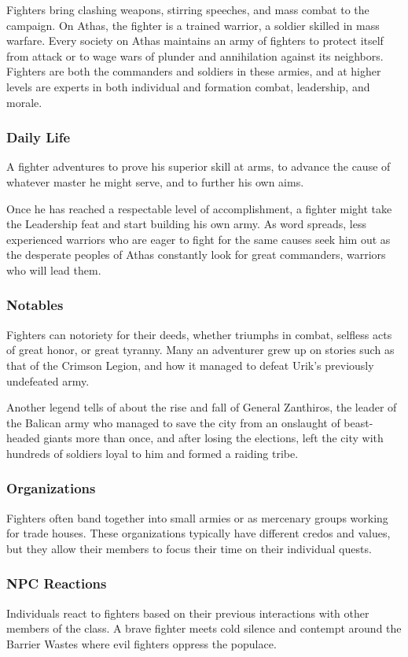 Fighters bring clashing weapons, stirring speeches, and mass combat to the campaign. On Athas, the fighter is a trained warrior, a soldier skilled in mass warfare. Every society on Athas maintains an army of fighters to protect itself from attack or to wage wars of plunder and annihilation against its neighbors. Fighters are both the commanders and soldiers in these armies, and at higher levels are experts in both individual and formation combat, leadership, and morale.

\subsubsection{Daily Life}
A fighter adventures to prove his superior skill at arms, to advance the cause of whatever master he might serve, and to further his own aims.

Once he has reached a respectable level of accomplishment, a fighter might take the Leadership feat and start building his own army. As word spreads, less experienced warriors who are eager to fight for the same causes seek him out as the desperate peoples of Athas constantly look for great commanders, warriors who will lead them.

\subsubsection{Notables}
Fighters can notoriety for their deeds, whether triumphs in combat, selfless acts of great honor, or great tyranny. Many an adventurer grew up on stories such as that of the Crimson Legion, and how it managed to defeat Urik's previously undefeated army.

Another legend tells of about the rise and fall of General Zanthiros, the leader of the Balican army who managed to save the city from an onslaught of beast-headed giants more than once, and after losing the elections, left the city with hundreds of soldiers loyal to him and formed a raiding tribe.

\subsubsection{Organizations}
Fighters often band together into small armies or as mercenary groups working for trade houses. These organizations typically have different credos and values, but they allow their members to focus their time on their individual quests.

\subsubsection{NPC Reactions}
Individuals react to fighters based on their previous interactions with other members of the class. A brave fighter meets cold silence and contempt around the Barrier Wastes where evil fighters oppress the populace.


